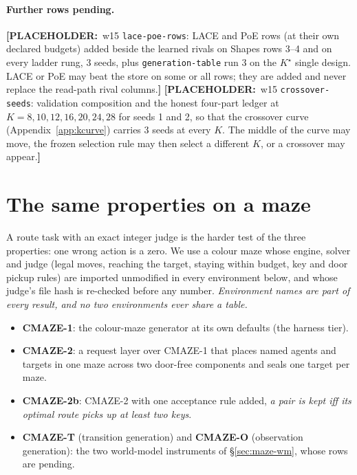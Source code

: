 \documentclass{article} %
\newcommand{\PLACEHOLDER}[1]{{\color{red}\textbf{[PLACEHOLDER:}~#1\textbf{]}}}
\newcommand{\Kstar}{\ensuremath{K^{\star}}}
\begin{document}
\paragraph{Further rows pending.} \PLACEHOLDER{w15 \texttt{lace-poe-rows}: LACE and PoE rows
(at their own declared budgets) added beside the learned rivals on Shapes rows 3--4 and on
every ladder rung, 3 seeds, plus \texttt{generation-table} run 3 on the $\Kstar$ single
design. LACE or PoE may beat the store on some or all rows; they are added and never replace
the read-path rival columns.}
\PLACEHOLDER{w15 \texttt{crossover-seeds}: validation composition and the honest four-part
ledger at $K=8,10,12,16,20,24,28$ for seeds 1 and 2, so that the crossover curve
(Appendix~\ref{app:kcurve}) carries 3 seeds at every $K$. The middle of the curve may move,
the frozen selection rule may then select a different $K$, or a crossover may appear.}

\section{The same properties on a maze}
\label{sec:maze}

A route task with an exact integer judge is the harder test of the three properties: one
wrong action is a zero. We use a colour maze whose engine, solver and judge (legal moves,
reaching the target, staying within budget, key and door pickup rules) are imported unmodified
in every environment below, and whose judge's file hash is re-checked before any number.
\emph{Environment names are part of every result, and no two environments ever share a
table.}
\begin{itemize}[leftmargin=*,itemsep=1pt]
\item \textbf{CMAZE-1}: the colour-maze generator at its own defaults (the harness tier).
\item \textbf{CMAZE-2}: a request layer over CMAZE-1 that places named agents and targets in
  one maze across two door-free components and seals one target per maze.
\item \textbf{CMAZE-2b}: CMAZE-2 with one acceptance rule added, \emph{a pair is kept iff its
  optimal route picks up at least two keys}.
\item \textbf{CMAZE-T} (transition generation) and \textbf{CMAZE-O} (observation generation):
  the two world-model instruments of \S\ref{sec:maze-wm}, whose rows are pending.
\end{itemize}
\end{document}

